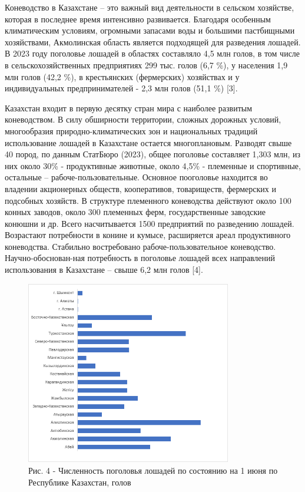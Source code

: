 \begin{multicols}{2}


Коневодство в Казахстане -- это важный вид деятельности в сельском
хозяйстве, которая в последнее время интенсивно развивается. Благодаря
особенным климатическим условиям, огромными запасами воды и большими
пастбищными хозяйствами, Акмолинская область является подходящей для
разведения лошадей. В 2023 году поголовье лошадей в областях составляло
4,5 млн голов, в том числе в сельскохозяйственных предприятиях 299 тыс.
голов (6,7 \%), у населения 1,9 млн голов (42,2 \%), в крестьянских
(фермерских) хозяйствах и у индивидуальных предпринимателей - 2,3 млн
голов (51,1 \%) {[}3{]}.

Казахстан входит в первую десятку стран мира с наиболее развитым
коневодством. В силу обширности территории, сложных дорожных условий,
многообразия природно-климатических зон и национальных традиций
использование лошадей в Казахстане остается многоплановым. Разводят
свыше 40 пород, по данным СтатБюро (2023), общее поголовье составляет
1,303 млн, из них около 30\% - продуктивные животные, около 4,5\% -
племенные и спортивные, остальные -- рабоче-пользовательные. Основное
пооголовье находится во владении акционерных обществ, кооперативов,
товариществ, фермерских и подсобных хозяйств. В структуре племенного
коневодства действуют около 100 конных заводов, около 300 племенных
ферм, государственные заводские конюшни и др. Всего насчитывается 1500
предприятий по разведению лошадей. Возрастают потребности в конине и
кумысе, расширяется ареал продуктивного коневодства. Стабильно
востребовано рабоче-пользовательное коневодство. Научно-обоснован-ная
потребность в поголовье лошадей всех направлений использования в
Казахстане -- свыше 6,2 млн голов {[}4{]}.
\end{multicols}

\begin{figure}[H]
	\centering
	\includegraphics[width=0.8\textwidth]{assets/309}
	\caption*{Рис. 4 - Численность поголовья лошадей по состоянию на 1 июня по Республике Казахстан, голов
	}
\end{figure}

